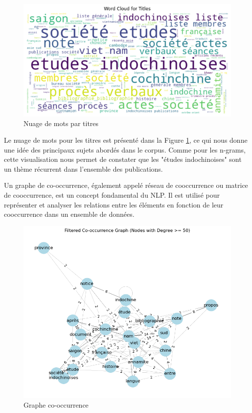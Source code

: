 \begin{figure}
    \centering
    \includegraphics[width=12cm]{img/2.3.word_cloud_title.png}
    \caption{Nuage de mots par titres}
    \label{fig:nuage_titre}
\end{figure}

Le nuage de mots pour les titres est présenté dans la Figure \ref{fig:nuage_titre}, ce qui nous donne une idée des principaux sujets abordés dans le corpus. Comme pour les n-grams, cette visualisation nous permet de constater que les "études indochinoises" sont un thème récurrent dans l'ensemble des publications.

Un graphe de co-occurrence, également appelé réseau de cooccurrence ou matrice de cooccurrence, est un concept fondamental du NLP. Il est utilisé pour représenter et analyser les relations entre les éléments en fonction de leur cooccurrence dans un ensemble de données.

\begin{figure}[H]
    \centering
    \includegraphics[width=12cm]{img/2.4.co-occurence-title.png}
    \caption{Graphe co-occurrence}
    \label{graph_cooc}
\end{figure}

